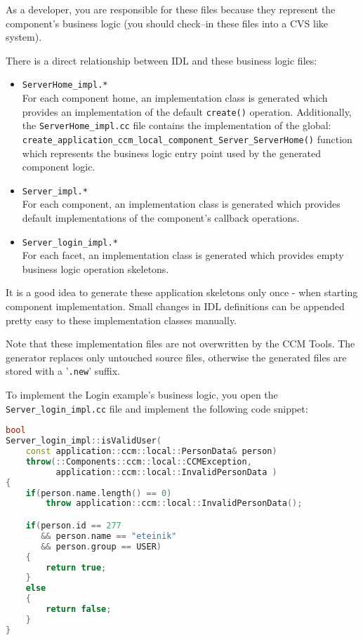 As a developer, you are responsible for these files because they represent the
component's business logic (you should check--in these files into a CVS like system).

\vspace{3mm}
There is a direct relationship between IDL and these business logic files:
\begin{itemize}
	\item {\tt ServerHome\_impl.*}\\
	For each component home, an implementation class is generated which provides an
	implementation of the default {\tt create()} operation.
	Additionally, the {\tt ServerHome\_impl.cc} file contains the implementation of
	the global: \\
    {\tt create\_application\_ccm\_local\_component\_Server\_ServerHome()} 
 	function which represents the business logic entry point used by the generated 
 	component logic. 

\item {\tt Server\_impl.*}\\
	For each component, an implementation class is generated which provides 
	default implementations of the component's callback operations.
	
\item {\tt Server\_login\_impl.*}\\
	For each facet, an implementation class is generated which provides empty
	business logic operation skeletons.
\end{itemize}

It is a good idea to generate these application skeletons only once - when starting 
component implementation. 
Small changes in IDL definitions can be appended pretty easy to these
implementation classes manually.

 \vspace{3mm}
Note that these implementation files are not overwritten by the CCM Tools.
The generator replaces only untouched source files, otherwise the
generated files are stored with a '{\tt .new}' suffix.

 \vspace{3mm}
To implement the Login example's business logic, you open the 
{\tt Server\_login\_impl.cc} file and implement the following code snippet:

\begin{footnotesize}
\begin{lstlisting}[language=C++]
bool
Server_login_impl::isValidUser(
    const application::ccm::local::PersonData& person)
    throw(::Components::ccm::local::CCMException,
          application::ccm::local::InvalidPersonData )
{
    if(person.name.length() == 0)
        throw application::ccm::local::InvalidPersonData();

    if(person.id == 277 
       && person.name == "eteinik"
       && person.group == USER) 
    {
        return true;
    }
    else 
    {
        return false;
    }
}
\end{lstlisting}
\end{footnotesize}


